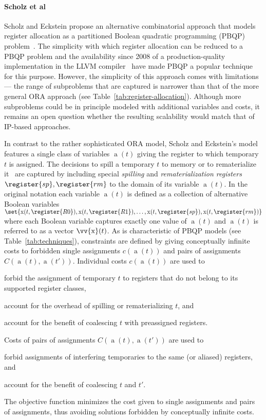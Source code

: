 \documentclass[acmsmall,authorversion,nonacm]{acmart}
\newcommand{\noMathVar}[2]{\operatorname{#1}(#2)}
\newcommand{\var}[2]{$\noMathVar{#1}{#2}$}
\begin{document}
\paragraph{Scholz et al}

Scholz and Eckstein propose an alternative combinatorial approach that
models register allocation as a partitioned Boolean quadratic
programming (PBQP) problem~\cite{Scholz2002}.
The simplicity with which register allocation can be reduced to a PBQP
problem and the availability since 2008 of a production-quality
implementation in the LLVM compiler~\cite{Lattner2004} have made PBQP
a popular technique for this purpose.
However, the simplicity of this approach comes with limitations ---
the range of subproblems that are captured is narrower than that of
the more general ORA approach (see
Table~\ref{tab:register-allocation}).
Although more subproblems could be in principle modeled with
additional variables and costs, it remains an open question whether
the resulting scalability would match that of IP-based approaches.

In contrast to the rather sophisticated ORA model, Scholz and
Eckstein's model features a single class of variables \var{a}{t}
giving the register to which temporary $t$ is assigned.
The decisions to spill a temporary $t$ to memory or to rematerialize
it~\cite[Chapter 4]{Hames2011} are captured by including special
\emph{spilling} and \emph{rematerialization registers} $\register{sp},
\register{rm}$ to the domain of its variable \var{a}{t}.
In the original notation each variable \var{a}{t} is defined as a
collection of alternative Boolean variables
$\set{\noMathVar{x}{t,\register{R0}}, \noMathVar{x}{t,\register{R1}},
  \ldots, \noMathVar{x}{t,\register{sp}},
  \noMathVar{x}{t,\register{rm}}}$ where each Boolean variable
captures exactly one value of \var{a}{t} and \var{a}{t} is referred to
as a vector $\noMathVar{\vv{x}}{t}$.
As is characteristic of PBQP models (see Table~\ref{tab:techniques}),
constraints are defined by giving conceptually infinite costs to
forbidden single assignments $c(\noMathVar{a}{t})$ and pairs of
assignments $C(\noMathVar{a}{t}, \noMathVar{a}{t'})$.
Individual costs $c(\noMathVar{a}{t})$ are used to
\begin{inparaitem}[]
\item forbid the assignment of temporary $t$ to registers that do not
  belong to its supported register classes,
\item account for the overhead of spilling or rematerializing $t$, and
\item account for the benefit of coalescing $t$ with preassigned
  registers.
\end{inparaitem}
Costs of pairs of assignments $C(\noMathVar{a}{t},
\noMathVar{a}{t'})$ are used to
\begin{inparaitem}[]
\item forbid assignments of interfering temporaries to the same (or
  aliased) registers, and
\item account for the benefit of coalescing $t$ and $t'$\!.
\end{inparaitem}
The objective function minimizes the cost given to single assignments
and pairs of assignments, thus avoiding solutions forbidden by
conceptually infinite costs.
\end{document}
